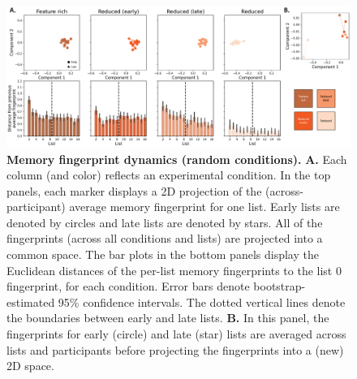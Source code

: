 \documentclass{article}
\begin{document}
\begin{figure}[tp] \centering
    \includegraphics[width=\textwidth]{figures/fingerprint_trajectories_random}
    
    \caption{\textbf{Memory fingerprint dynamics (random conditions).}
    \textbf{A.} Each column (and color) reflects an experimental condition. In
    the top panels, each marker displays a 2D projection of the
    (across-participant) average memory fingerprint for one list. Early lists
    are denoted by circles and late lists are denoted by stars. All of the
    fingerprints (across all conditions and lists) are projected into a common
    space. The bar plots in the bottom panels display the Euclidean distances
    of the per-list memory fingerprints to the list 0 fingerprint, for each
    condition. Error bars denote bootstrap-estimated 95\% confidence intervals.
    The dotted vertical lines denote the boundaries between early and late
    lists. \textbf{B.} In this panel, the fingerprints for early (circle) and
    late (star) lists are averaged across lists and participants before
    projecting the fingerprints into a (new) 2D space.} \label{fig:fingerprint-trajectories-random}
    
    \end{figure}
\end{document}

